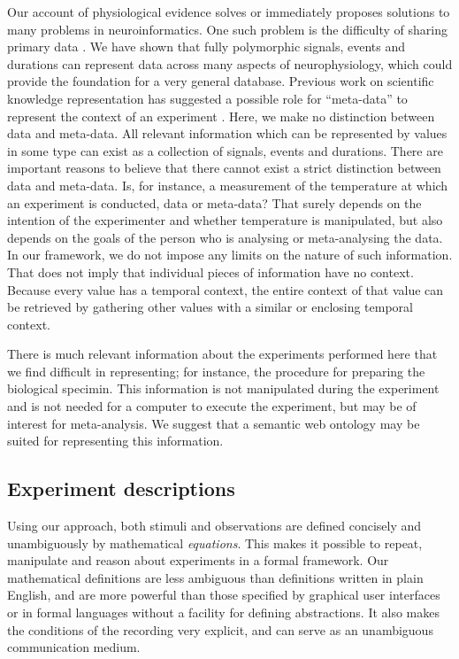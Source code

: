 Our account of physiological evidence solves or immediately proposes
solutions to many problems in neuroinformatics. One such problem is
the difficulty of sharing primary data \citep{Amari2002}. We have
shown that fully polymorphic signals, events and durations can
represent data across many aspects of neurophysiology, which could
provide the foundation for a very general database. Previous work on
scientific knowledge representation has suggested a possible role for
``meta-data'' to represent the context of an experiment
\citep{Bower2009}. Here, we make no distinction between data and
meta-data. All relevant information which can be represented by values
in some type can exist as a collection of signals, events and
durations. There are important reasons to believe that there cannot
exist a strict distinction between data and meta-data. Is, for
instance, a measurement of the temperature at which an experiment is
conducted, data or meta-data?  That surely depends on the intention of
the experimenter and whether temperature is manipulated, but also
depends on the goals of the person who is analysing or meta-analysing
the data. In our framework, we do not impose any limits on the nature
of such information. That does not imply that individual pieces of
information have no context. Because every value has a temporal
context, the entire context of that value can be retrieved by
gathering other values with a similar or enclosing temporal context.

There is much relevant information about the experiments performed
here that we find difficult in representing; for instance, the
procedure for preparing the biological specimin. This information is
not manipulated during the experiment and is not needed for a computer
to execute the experiment, but may be of interest for
meta-analysis. We suggest that a semantic web ontology may be suited
for representing this information.

\subsection*{Experiment descriptions}

Using our approach, both stimuli and observations are defined
concisely and unambiguously by mathematical \emph{equations}. This
makes it possible to repeat, manipulate and reason about experiments
in a formal framework. Our mathematical definitions are less ambiguous
than definitions written in plain English, and are more powerful than
those specified by graphical user interfaces or in formal languages
without a facility for defining abstractions. It also makes the
conditions of the recording very explicit, and can serve as an
unambiguous communication medium.

